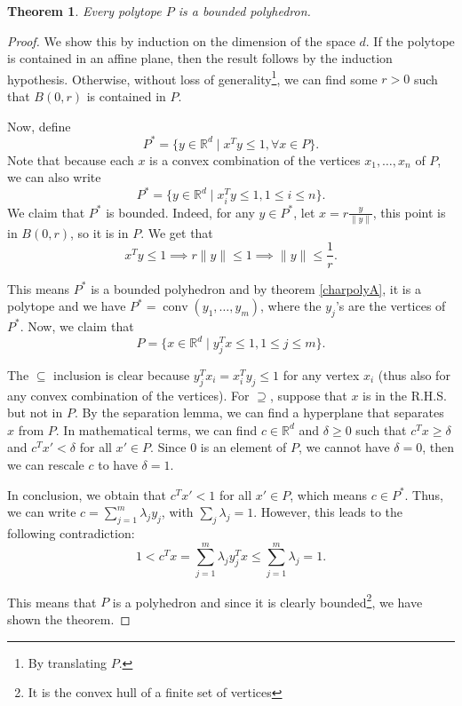 \documentclass{tufte-handout}
\newtheorem{thm}{Theorem}
\theoremstyle{definition}
\theoremstyle{remark}
\newcommand{\norm}[1]{\lVert #1 \rVert}
\newcommand{\R}{\mathbb{R}}
\DeclareMathOperator{\conv}{conv}
\begin{document}
\begin{thm}\label{charpolyB}
	Every polytope $P$ is a bounded polyhedron.
\end{thm}
\begin{proof}
	We show this by induction on the dimension of the space $d$. If the polytope is contained in an affine plane, then the result follows by the induction hypothesis. Otherwise, without loss of generality\footnote{By translating $P$.}, we can find some $r>0$ such that $B(0,r)$ is contained in $P$.
	
	Now, define $$P^*= \{y \in \R^d \mid x^Ty \leq 1, \forall x \in P\}.$$
	Note that because each $x$ is a convex combination of the vertices $x_1, \dots, x_n$ of $P$, we can also write $$P^* = \{y \in \R^d\mid x_i^Ty \leq 1, 1 \leq i \leq n\}.$$
	We claim that $P^*$ is bounded. Indeed, for any $y \in P^*$, let $x = r\frac{y}{\norm{y}}$, this point is in $B(0,r)$, so it is in $P$. We get that 
	$$x^Ty \leq 1 \implies r\norm{y} \leq 1 \implies \norm{y} \leq \frac{1}{r}.$$
	
	This means $P^*$ is a bounded polyhedron and by theorem \ref{charpolyA}, it is a polytope and we have $P^* = \conv(y_1, \dots, y_m)$, where the $y_j$'s are the vertices of $P^*$. Now, we claim that 
	$$P = \{x \in \R^d \mid y_j^Tx \leq 1, 1\leq j \leq m\}.$$
	
	The $\subseteq$ inclusion is clear because $y_j^Tx_i = x_i^Ty_j \leq 1$ for any vertex $x_i$ (thus also for any convex combination of the vertices). For $\supseteq$, suppose that $x$ is in the R.H.S. but not in $P$. By the separation lemma, we can find a hyperplane that separates $x$ from $P$. In mathematical terms, we can find $c\in \R^d$ and $\delta \geq 0$ such that $c^Tx \geq \delta$ and $c^Tx' < \delta$ for all $x' \in P$. Since $0$ is an element of $P$, we cannot have $\delta = 0$, then we can rescale $c$ to have $\delta = 1$.
	
	In conclusion, we obtain that $c^Tx' < 1$ for all $x' \in P$, which means $c\in P^*$. Thus, we can write $c = \sum_{j=1}^m \lambda_j y_j$, with $\sum_j \lambda_j = 1$. However, this leads to the following contradiction:
	$$1 < c^Tx = \sum_{j=1}^m \lambda_j y_j^Tx \leq \sum_{j=1}^m \lambda_j = 1.$$
	
	This means that $P$ is a polyhedron and since it is clearly bounded\footnote{It is the convex hull of a finite set of vertices}, we have shown the theorem.
\end{proof}
\end{document}

